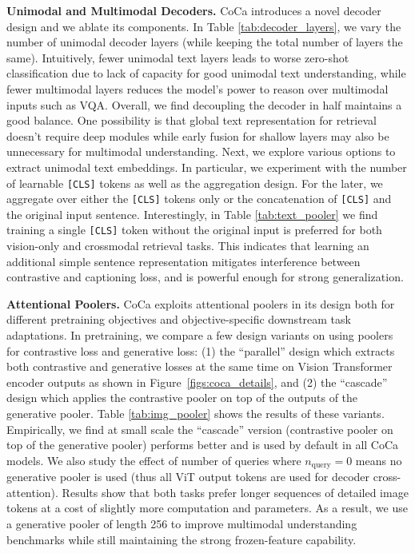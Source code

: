 \textbf{Unimodal and Multimodal Decoders.}
CoCa introduces a novel decoder design and we ablate its components.
In Table \ref{tab:decoder_layers},
we vary the number of unimodal decoder layers (while keeping the total number of layers the same).
Intuitively,
fewer unimodal text layers leads to worse zero-shot classification due to lack of capacity for good unimodal text understanding,
while fewer multimodal layers reduces the model's power to reason over multimodal inputs such as VQA.
Overall, we find decoupling the decoder in half maintains a good balance.
One possibility is that global text representation for retrieval doesn't require deep modules \cite{pham2021combined} while early fusion for shallow layers may also be unnecessary for multimodal understanding.
Next, we explore various options to extract unimodal text embeddings.
In particular, 
we experiment with the number of learnable \verb+[CLS]+ tokens as well as the aggregation design.
For the later,
we aggregate over either the \verb+[CLS]+ tokens only or the concatenation of \verb+[CLS]+ and the original input sentence.
Interestingly, in Table \ref{tab:text_pooler}
we find training a single \verb+[CLS]+ token without the original input
is preferred for both vision-only and crossmodal retrieval tasks.
This indicates that learning an additional simple sentence representation mitigates interference between contrastive and captioning loss,
and is powerful enough for strong generalization.


\textbf{Attentional Poolers.}
CoCa exploits attentional poolers in its design both for different pretraining objectives and objective-specific downstream task adaptations.
In pretraining, we compare a few design variants on using poolers for contrastive loss and generative loss: (1) the ``parallel'' design which extracts both contrastive and generative losses at the same time on Vision Transformer encoder outputs as shown in Figure~\ref{figs:coca_details}, and (2) the ``cascade'' design which applies the contrastive pooler on top of the outputs of the generative pooler. Table \ref{tab:img_pooler} shows the results of these variants.
Empirically,
we find at small scale the ``cascade'' version (contrastive pooler on top of the generative pooler) performs better and is used by default in all CoCa models.
We also study the effect of number of queries where $n_{\text{query}}=0$ means no generative pooler is used (thus all ViT output tokens are used for decoder cross-attention).
Results show that both tasks prefer longer sequences of detailed image tokens at a cost of slightly more computation and parameters.
As a result,
we use a generative pooler of length 256 to improve multimodal understanding benchmarks while still maintaining the strong frozen-feature capability.